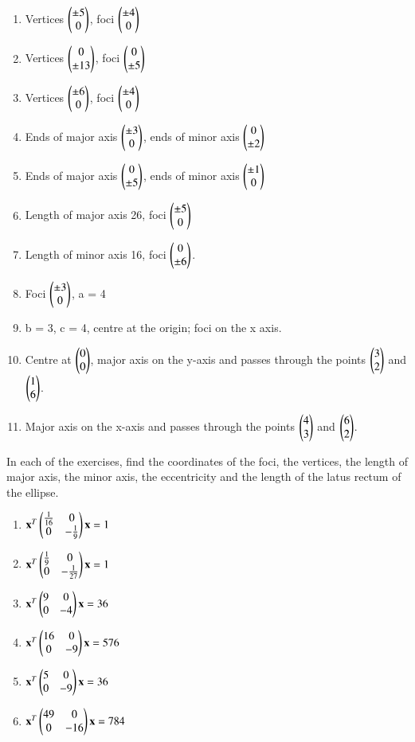 \begin{enumerate}
\item Vertices $\begin{pmatrix}\pm 5\\ 0\end{pmatrix}$, foci $\begin{pmatrix}\pm 4\\ 0\end{pmatrix}$ \item  Vertices $\begin{pmatrix}0\\ \pm 13\end{pmatrix}$, foci $\begin{pmatrix}0\\ \pm 5\end{pmatrix}$ \item  Vertices $\begin{pmatrix}\pm 6\\ 0\end{pmatrix}$, foci $\begin{pmatrix}\pm 4\\ 0\end{pmatrix}$ \item  Ends of major axis $\begin{pmatrix}\pm 3\\ 0\end{pmatrix}$, ends of minor axis $\begin{pmatrix}0\\ \pm 2\end{pmatrix}$
\item  Ends of major axis $\begin{pmatrix}0\\ \pm 5 \end{pmatrix}$, ends of minor axis $\begin{pmatrix}\pm 1\\ 0\end{pmatrix}$ \item  Length of major axis 26, foci $\begin{pmatrix}\pm 5\\ 0\end{pmatrix}$ \item  Length of minor axis 16, foci $\begin{pmatrix}0\\ \pm 6\end{pmatrix}$. \item  Foci $\begin{pmatrix}\pm 3\\ 0\end{pmatrix}$, a = 4 \item  b = 3, c = 4, centre at the origin; foci on the x axis. \item  Centre at $\begin{pmatrix}0\\0\end{pmatrix}$, major axis on the y-axis and passes through the points $\begin{pmatrix}3\\ 2\end{pmatrix}$ and $\begin{pmatrix}1\\6\end{pmatrix}$.
\item  Major axis on the x-axis and passes through the points $\begin{pmatrix}4\\3\end{pmatrix}$ and $\begin{pmatrix}6\\2\end{pmatrix}$.
\end{enumerate}
%
%
\item In each of the exercises, find the coordinates of the foci, the vertices, the length of major axis, the minor axis, the eccentricity and the length of the latus rectum of the ellipse.
%
\begin{enumerate}
\item 
$
\mathbf{x}^T\begin{pmatrix}\frac{1}{16} & 0 \\ 0 & -\frac{1}{9}\end{pmatrix}\mathbf{x} = 1
$
\item 
$
\mathbf{x}^T\begin{pmatrix}\frac{1}{9} & 0 \\ 0 & -\frac{1}{27}\end{pmatrix}\mathbf{x} = 1
$
%
\item 
$
\mathbf{x}^T\begin{pmatrix}9 & 0 \\ 0 & -4\end{pmatrix}\mathbf{x} = 36
$
%
\item 
$
\mathbf{x}^T\begin{pmatrix}16 & 0 \\ 0 & -9\end{pmatrix}\mathbf{x} = 576
$
%
\item 
$
\mathbf{x}^T\begin{pmatrix}5 & 0 \\ 0 & -9\end{pmatrix}\mathbf{x} = 36
$
\item 
$
\mathbf{x}^T\begin{pmatrix}49 & 0 \\ 0 & -16\end{pmatrix}\mathbf{x} = 784
$
%
%
\end{enumerate}
